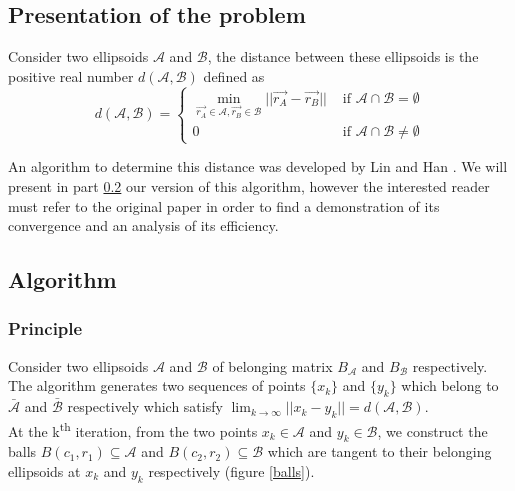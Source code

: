 \documentclass[class=report, float=false, crop=false]{standalone}
\begin{document}
\subsection{Presentation of the problem}

Consider two ellipsoids $\mathcal{A}$ and $\mathcal{B}$, the distance between these ellipsoids is the positive real number $d(\mathcal{A},\mathcal{B})$ defined as
\begin{equation}
d(\mathcal{A},\mathcal{B}) = \begin{cases} \min_{\vec{r_A} \in \mathcal{A},\vec{r_B} \in \mathcal{B}} ||\vec{r_A} - \vec{r_B}|| &\text{ if } \mathcal{A} \cap \mathcal{B} = \emptyset\\ 0 &\text{ if } \mathcal{A} \cap \mathcal{B} \neq \emptyset \end{cases}
\label{distance_definition}
\end{equation}

An algorithm to determine this distance was developed by Lin and Han \cite{lin2002distance}. We will present in part \ref{distance_algorithm} our version of this algorithm, however the interested reader must refer to the original paper in order to find a demonstration of its convergence and an analysis of its efficiency.

\subsection{Algorithm}
\label{distance_algorithm}

\subsubsection{Principle}

Consider two ellipsoids $\mathcal{A}$ and $\mathcal{B}$ of belonging matrix $B_{\mathcal{A}}$ and $B_{\mathcal{B}}$ respectively.\\

The algorithm generates two sequences of points $\{x_k\}$ and $\{y_k\}$ which belong to $\bar{\mathcal{A}}$ and $\bar{\mathcal{B}}$ respectively which satisfy $\lim_{k \to \infty} ||x_k - y_k|| = d(\mathcal{A},\mathcal{B})$.\\

At the k\textsuperscript{th} iteration, from the two points $x_k \in \mathcal{A}$ and $y_k \in \mathcal{B}$, we construct the balls $B(c_1,r_1) \subseteq \mathcal{A}$ and $B(c_2,r_2) \subseteq \mathcal{B}$ which are tangent to their belonging ellipsoids at $x_k$ and $y_k$ respectively (figure \ref{balls}).
\end{document}
